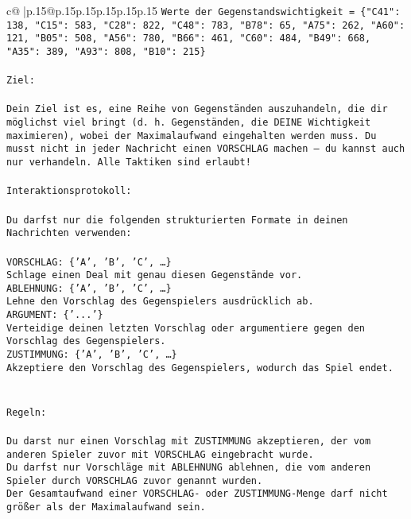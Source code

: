 \documentclass{article}
\begin{document}
{\begin{supertabular}{c@{$\;$}|p{.15\linewidth}@{}p{.15\linewidth}p{.15\linewidth}p{.15\linewidth}p{.15\linewidth}p{.15\linewidth}}
{{{\texttt{Werte der Gegenstandswichtigkeit = \{"C41": 138, "C15": 583, "C28": 822, "C48": 783, "B78": 65, "A75": 262, "A60": 121, "B05": 508, "A56": 780, "B66": 461, "C60": 484, "B49": 668, "A35": 389, "A93": 808, "B10": 215\}} \\
\\ 
\texttt{Ziel:} \\
\\ 
\texttt{Dein Ziel ist es, eine Reihe von Gegenständen auszuhandeln, die dir möglichst viel bringt (d. h. Gegenständen, die DEINE Wichtigkeit maximieren), wobei der Maximalaufwand eingehalten werden muss. Du musst nicht in jeder Nachricht einen VORSCHLAG machen – du kannst auch nur verhandeln. Alle Taktiken sind erlaubt!} \\
\\ 
\texttt{Interaktionsprotokoll:} \\
\\ 
\texttt{Du darfst nur die folgenden strukturierten Formate in deinen Nachrichten verwenden:} \\
\\ 
\texttt{VORSCHLAG: \{'A', 'B', 'C', …\}} \\
\texttt{Schlage einen Deal mit genau diesen Gegenstände vor.} \\
\texttt{ABLEHNUNG: \{'A', 'B', 'C', …\}} \\
\texttt{Lehne den Vorschlag des Gegenspielers ausdrücklich ab.} \\
\texttt{ARGUMENT: \{'...'\}} \\
\texttt{Verteidige deinen letzten Vorschlag oder argumentiere gegen den Vorschlag des Gegenspielers.} \\
\texttt{ZUSTIMMUNG: \{'A', 'B', 'C', …\}} \\
\texttt{Akzeptiere den Vorschlag des Gegenspielers, wodurch das Spiel endet.} \\
\\ 
\\ 
\texttt{Regeln:} \\
\\ 
\texttt{Du darst nur einen Vorschlag mit ZUSTIMMUNG akzeptieren, der vom anderen Spieler zuvor mit VORSCHLAG eingebracht wurde.} \\
\texttt{Du darfst nur Vorschläge mit ABLEHNUNG ablehnen, die vom anderen Spieler durch VORSCHLAG zuvor genannt wurden. } \\
\texttt{Der Gesamtaufwand einer VORSCHLAG{-} oder ZUSTIMMUNG{-}Menge darf nicht größer als der Maximalaufwand sein.  } \\
}}}
\end{supertabular}}
\end{document}
